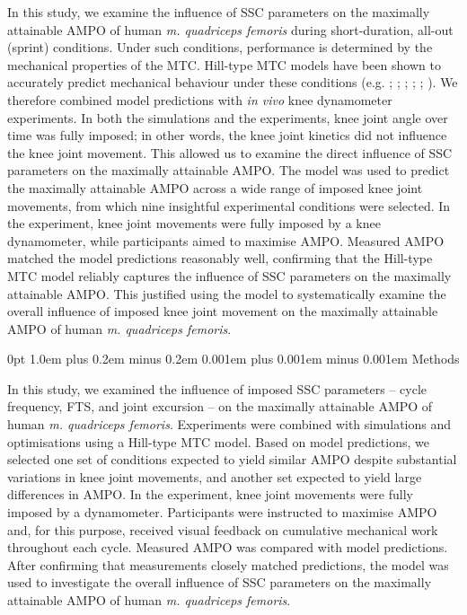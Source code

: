 \documentclass[
  11pt,
  a4paper]{article}
\makeatletter
\renewcommand{\section}{%
  \@startsection{section}{1}
    {0pt} 					%
    {1.0em plus 0.2em minus 0.2em} 	%
    {0.001em plus 0.001em minus 0.001em}    	%
    {\Large\bfseries\sffamily}%
}
\makeatother
\begin{document}
In this study, we examine the influence of SSC parameters on the
maximally attainable AMPO of human \emph{m. quadriceps femoris} during
short-duration, all-out (sprint) conditions. Under such conditions,
performance is determined by the mechanical properties of the MTC.
Hill-type MTC models have been shown to accurately predict mechanical
behaviour under these conditions (e.g.
; ;
;
;
;
). We
therefore combined model predictions with \emph{in vivo} knee
dynamometer experiments. In both the simulations and the experiments,
knee joint angle over time was fully imposed; in other words, the knee
joint kinetics did not influence the knee joint movement. This allowed
us to examine the direct influence of SSC parameters on the maximally
attainable AMPO. The model was used to predict the maximally attainable
AMPO across a wide range of imposed knee joint movements, from which
nine insightful experimental conditions were selected. In the
experiment, knee joint movements were fully imposed by a knee
dynamometer, while participants aimed to maximise AMPO. Measured AMPO
matched the model predictions reasonably well, confirming that the
Hill-type MTC model reliably captures the influence of SSC parameters on
the maximally attainable AMPO. This justified using the model to
systematically examine the overall influence of imposed knee joint
movement on the maximally attainable AMPO of human \emph{m. quadriceps
femoris}.

\section{Methods}\label{methods}

In this study, we examined the influence of imposed SSC parameters --
cycle frequency, FTS, and joint excursion -- on the maximally attainable
AMPO of human \emph{m. quadriceps femoris}. Experiments were combined
with simulations and optimisations using a Hill-type MTC model. Based on
model predictions, we selected one set of conditions expected to yield
similar AMPO despite substantial variations in knee joint movements, and
another set expected to yield large differences in AMPO. In the
experiment, knee joint movements were fully imposed by a dynamometer.
Participants were instructed to maximise AMPO and, for this purpose,
received visual feedback on cumulative mechanical work throughout each
cycle. Measured AMPO was compared with model predictions. After
confirming that measurements closely matched predictions, the model was
used to investigate the overall influence of SSC parameters on the
maximally attainable AMPO of human \emph{m. quadriceps femoris}.
\end{document}
